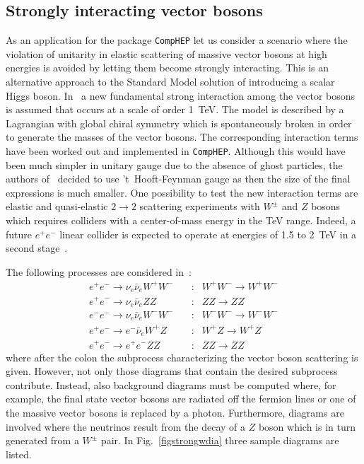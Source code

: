 %
%
\subsection{Strongly interacting vector bosons\label{sec:applic:strongW}}

As an application for the package {\tt CompHEP} let us consider a
scenario where the violation of unitarity in elastic scattering of
massive vector bosons at high energies is avoided by letting them become
strongly interacting.  This is an alternative approach to the Standard
Model solution of introducing a scalar Higgs boson. In~\cite{BHKPYZ98} a
new fundamental strong interaction among the vector bosons is assumed
that occurs at a scale of order 1~TeV.  The model is described by a
Lagrangian with global chiral symmetry which is spontaneously broken in
order to generate the masses of the vector bosons.  The corresponding
interaction terms have been worked out and implemented in {\tt CompHEP}.
Although this would have been much simpler in unitary gauge due to the
absence of ghost particles, the authors of~\cite{BHKPYZ98} decided to
use 't~Hooft-Feynman gauge as then the size of the final expressions is
much smaller.  One possibility to test the new interaction terms are
elastic and quasi-elastic $2\to 2$ scattering experiments with $W^\pm$
and $Z$ bosons which requires colliders with a center-of-mass energy in
the TeV range. Indeed, a future $e^+e^-$ linear collider is expected to
operate at energies of 1.5 to 2~TeV in a second stage~\cite{Acc97}.

The following processes are considered
in~\cite{BHKPYZ98}:
\begin{eqnarray}
e^+e^- \to \nu_e \bar{\nu}_e W^+ W^-
&\quad:&
W^+ W^- \to W^+ W^-
\nonumber\\
e^+e^- \to \nu_e \bar{\nu}_e Z Z
&\quad:&
Z Z \to Z Z
\nonumber\\
e^-e^- \to \nu_e \bar{\nu}_e W^- W^-
&\quad:&
W^- W^- \to W^- W^-
\nonumber\\
e^+e^- \to e^- \bar{\nu}_e W^+ Z
&\quad:&
W^+ Z \to W^+ Z
\nonumber\\
e^+e^- \to e^+ e^- Z Z
&\quad:&
Z Z \to Z Z
\label{eqstrongw1}
\end{eqnarray}
where after the colon the subprocess
characterizing the vector boson scattering is given. However, not only
those diagrams that contain the desired subprocess contribute.
Instead, also background diagrams must be computed where, for example, the
final state vector bosons are radiated off the fermion lines or one of
the massive vector bosons is replaced by a photon.  Furthermore,
diagrams are involved where the neutrinos result from the decay of a $Z$
boson which is in turn generated from a $W^\pm$ pair.  In
Fig.~\ref{figstrongwdia} three sample diagrams are listed.

